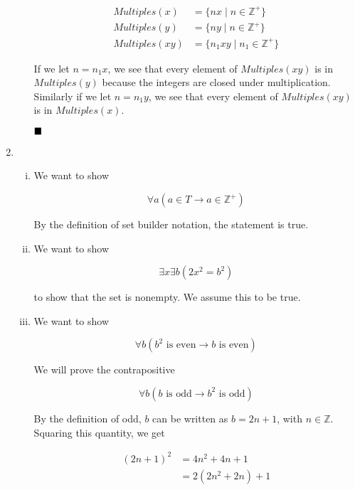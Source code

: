 \documentclass{article}
\newcommand{\Z}{\mathbb{Z}}
\newcommand{\mult}{\textit{Multiples}}
\newcommand{\qed}{\hfill\blacksquare}
\begin{document}
\begin{enumerate}
\begin{enumerate}
		            \begin{align*}
			            \mult(x)  & = \{nx \mid n \in \Z^+ \}     \\
			            \mult(y)  & = \{ny \mid n \in \Z^+ \}     \\
			            \mult(xy) & = \{n_1xy \mid n_1 \in \Z^+\}
		            \end{align*}

		            If we let $n = n_1x$, we see that every element of $\mult(xy)$ is in
		            $\mult(y)$ because the integers are closed under
		            multiplication. Similarly if we let $n = n_1y$, we see
		            that every element of $\mult(xy)$ is in $\mult(x)$.

		            $\qed$

	      \end{enumerate}

	\item \begin{enumerate}[(i)]
		      \item We want to show

		            $$
			            \forall a (a \in T \to a \in \Z^+)
		            $$

		            By the definition of set builder notation, the statement is true.

		      \item We want to show

		            $$
			            \exists x \exists b (2x^2 = b^2)
		            $$

		            to show that the set is nonempty. We assume this to be true.

		      \item We want to show

		            $$
			            \forall b (b^2 \text{ is even} \to b \text{ is even})
		            $$

		            We will prove the contrapositive

		            $$
			            \forall b (b \text{ is odd} \to b^2 \text{ is odd})
		            $$

		            By the definition of odd, $b$ can be written as $b = 2n + 1$, with $n \in \Z$.
		            Squaring this quantity, we get

		            \begin{align*}
			            (2n + 1)^2 & = 4n^2 + 4n + 1    \\
			                       & = 2(2n^2 + 2n) + 1 \\
		            \end{align*}


\end{enumerate}
\end{enumerate}
\end{document}
